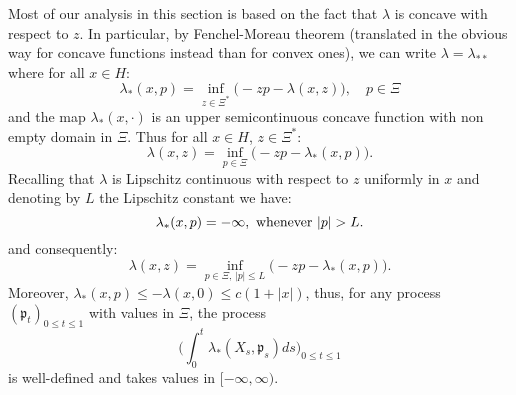 \documentclass[reqno,a4paper,11 pt]{article}
\numberwithin{equation}{section}
\begin{document}
Most of our analysis in this section is based on the fact that $\lambda$ is concave with 
respect to $z$. In particular, by Fenchel-Moreau theorem (translated in the obvious way for concave functions instead than for convex ones),
we can write $\lambda=\lambda_{**}$ where for all $x\in H$:
\begin{equation*}
\lambda_*(x,{p}) = \inf_{z \in \Xi^*} \bigl( -z p -\lambda(x,z)  \bigr) , \quad p\in \Xi
\end{equation*}
and the map $\lambda_*(x,\cdot)$ is an upper semicontinuous concave function with non empty domain in $\Xi$.
Thus for all $x\in H$, $z\in \Xi^*$:
\begin{equation*}
\lambda(x,z)=  \inf_{{p} \in \Xi} \bigl(- z {p} - \lambda_*(x,p)\bigr)
.\end{equation*}
Recalling that $\lambda$ is Lipschitz continuous with respect to $z$ uniformly in $x$ and denoting by 
$L$ the Lipschitz constant we have:
\begin{equation*}
\lambda_*(x,p) = -\infty,\hbox{ whenever } |p|>L.
\end{equation*}
and consequently:
\begin{equation*}
\lambda(x,z)=  \inf_{{p} \in \Xi, \, |p|\leq L} \bigl(- z {p} - \lambda_*(x,p)\bigr)
.\end{equation*}
 Moreover, $\lambda_*(x,{p}) \leq   -\lambda(x,0)\leq c(1+|x|)$, 
thus, for any process $(\mathfrak{p}_{t})_{0 \leq t \leq 1}$ with values in $\Xi$, the process 
\begin{equation*}
\biggl( \int_{0}^t \lambda_*(X_{s},\mathfrak{p}_{s}) ds \biggr)_{0 \leq t \leq 1}
\end{equation*}
is well-defined and takes values in $[-\infty,\infty)$. 
\end{document}
